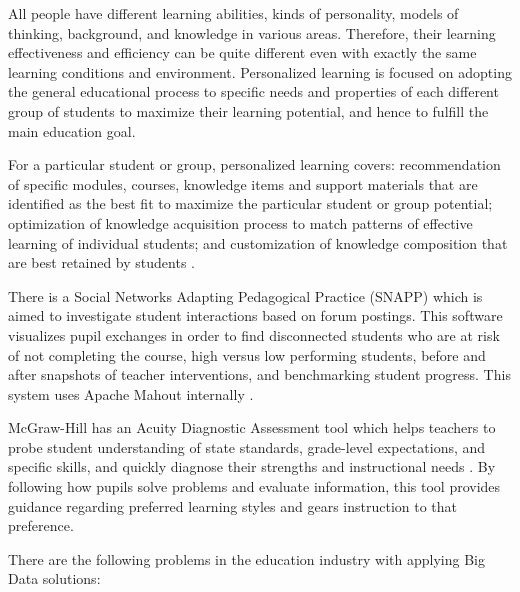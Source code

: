 \documentclass[runningheads]{llncs}
\begin{document}
\begin{enumerate}
All people have different learning abilities, kinds of personality, models of thinking, background, and knowledge in various areas. Therefore, their learning effectiveness and efficiency can be quite different even with exactly the same learning conditions and environment. Personalized learning is focused on adopting the general educational process to specific needs and properties of each different group of students to maximize their learning potential, and hence to fulfill the main education goal. 

For a particular student or group, personalized learning covers: recommendation of specific modules, courses, knowledge items and support materials that are identified as the best fit to maximize the particular student or group potential; optimization of knowledge acquisition process to match patterns of effective learning of individual
students; and customization of knowledge composition that are best retained by students \cite{EDUCATIONOPPORTUNITIES}.

\end{enumerate}

There is a Social Networks Adapting Pedagogical Practice (SNAPP) which is aimed to investigate student interactions based on forum postings. This software visualizes pupil exchanges in order to find disconnected students who are at risk of not completing the course, high versus low performing students, before and after snapshots of teacher interventions, and benchmarking student progress. This system uses Apache Mahout internally \cite{EDREPORT}. 

McGraw-Hill has an Acuity Diagnostic Assessment tool which helps teachers to probe student understanding of state standards, grade-level expectations, and specific skills, and quickly diagnose their strengths and instructional needs \cite{MCGRAW}. By following how pupils solve problems and evaluate information, this tool provides guidance regarding preferred learning styles and gears instruction to that preference. 

There are the following problems in the education industry with applying Big Data solutions:
\end{document}
